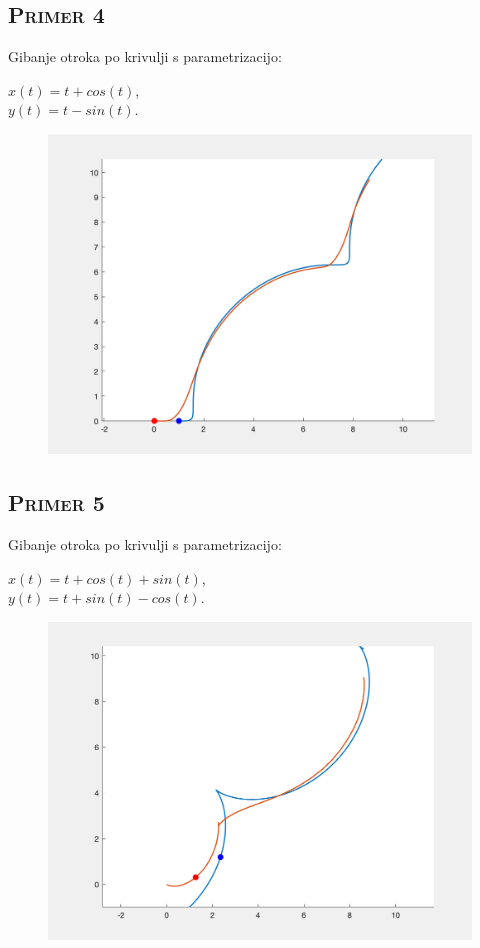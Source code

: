\documentclass[a4paper,12pt]{article}
\begin{document}
    \newpage
    \subsection{\textsc{Primer 4}}
    Gibanje otroka po krivulji s parametrizacijo:
    \begin{center}
    $x(t) = t + cos(t)$, \\
    $y(t) = t - sin(t)$. 
    \end{center}      
    \begin{figure}[!h]
        \centering
        \includegraphics[scale=0.4]{Primer3}
    \end{figure}
    

    \subsection{\textsc{Primer 5}}
    Gibanje otroka po krivulji s parametrizacijo:
    \begin{center}
    $x(t) = t + cos(t) + sin(t)$, \\
    $y(t) = t + sin(t) - cos(t)$. 
    \end{center}      
    \begin{figure}[!h]
        \centering
        \includegraphics[scale=0.4]{Primer4}
    \end{figure}
    
\end{document}
